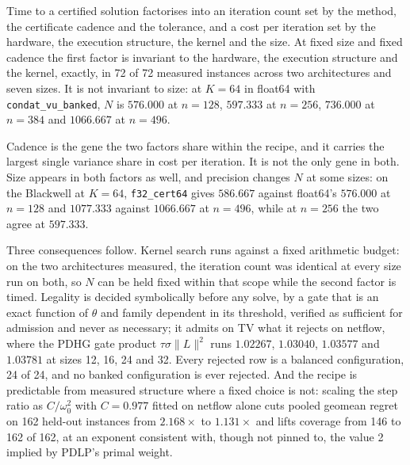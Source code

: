 Time to a certified solution factorises into an iteration count set by the
method, the certificate cadence and the tolerance, and a cost per iteration set
by the hardware, the execution structure, the kernel and the size. At fixed size
and fixed cadence the first factor is invariant to the hardware, the execution
structure and the kernel, exactly, in 72 of 72 measured instances across two
architectures and seven sizes. It is not invariant to size: at $K=64$ in
float64 with \texttt{condat\_vu\_banked}, $N$ is $576.000$ at $n{=}128$,
$597.333$ at $n{=}256$, $736.000$ at $n{=}384$ and $1066.667$ at $n{=}496$.

Cadence is the gene the two factors share within the recipe, and it carries the
largest single variance share in cost per iteration. It is not the only gene in
both. Size appears in both factors as well, and precision changes $N$ at some
sizes: on the Blackwell at $K=64$, \texttt{f32\_cert64} gives $586.667$ against
float64's $576.000$ at $n{=}128$ and $1077.333$ against $1066.667$ at $n{=}496$,
while at $n{=}256$ the two agree at $597.333$.

Three consequences follow. Kernel search runs against a fixed arithmetic budget:
on the two architectures measured, the iteration count was identical at every
size run on both, so $N$ can be held fixed within that scope while the second
factor is timed. Legality is decided symbolically before any solve, by a gate
that is an exact function of $\theta$ and family dependent in its threshold,
verified as sufficient for admission and never as necessary; it admits on TV
what it rejects on netflow, where the PDHG gate product
$\tau \sigma \lVert L \rVert^2$ runs $1.02267$, $1.03040$, $1.03577$ and
$1.03781$ at sizes 12, 16, 24 and 32. Every rejected row is a balanced
configuration, 24 of 24, and no banked configuration is ever rejected. And the
recipe is predictable from measured structure where a fixed choice is not:
scaling the step ratio as $C / \omega_0^{2}$ with $C = 0.977$ fitted on netflow
alone cuts pooled geomean regret on 162 held-out instances from $2.168\times$ to
$1.131\times$ and lifts coverage from 146 to 162 of 162, at an exponent
consistent with, though not pinned to, the value 2 implied by PDLP's primal
weight.

